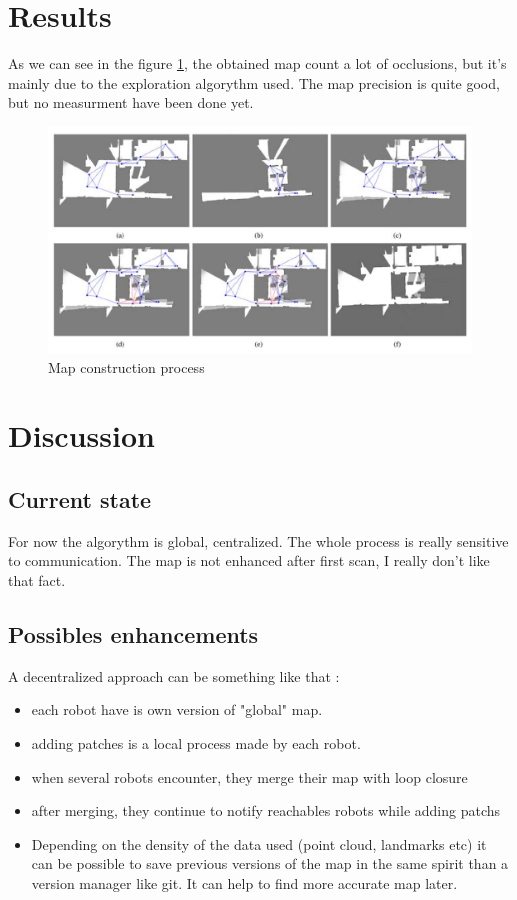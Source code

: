 \documentclass[twoside,twocolumn]{article}
\begin{document}
\section{Results}
As we can see in the figure \ref{fig:map}, the obtained map count a lot of occlusions, but it's mainly due to the exploration algorythm used.
The map precision is quite good, but no measurment have been done yet.
\begin{figure}
  \includegraphics[scale=0.1]{images/manifold}
  \caption{Map construction process}
  \label{fig:map}
\end{figure}


\section{Discussion}
\subsection{Current state}
For now the algorythm is global, centralized.
The whole process is really sensitive to communication.
The map is not enhanced after first scan, I really don't like that fact.
\subsection{Possibles enhancements}
A decentralized approach can be something like that :
\begin{itemize}
  \item each robot have is own version of "global" map.
  \item adding patches is a local process made by each robot.
  \item when several robots encounter, they merge their map with loop closure
  \item after merging, they continue to notify reachables robots while adding patchs
  \item Depending on the density of the data used (point cloud, landmarks etc) it can be possible to save previous versions of the map in the same spirit than a version manager like git. It can help to find more accurate map later.
\end{itemize}

\printbibliography
\end{document}
